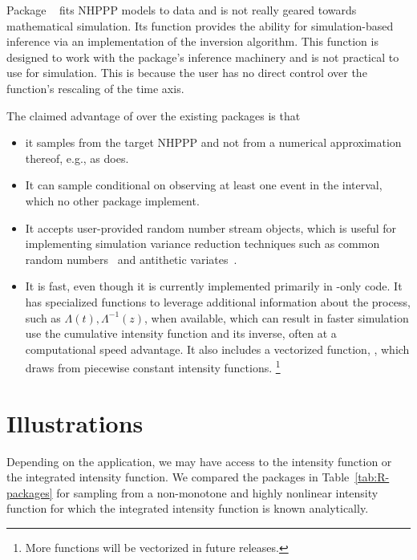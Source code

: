 \documentclass[article,nojss]{jss}\usepackage[]{graphicx}\usepackage[]{xcolor}
\newcommand{\fct}[1]{\code{#1()}}
\begin{document}
Package ~\citep{NHPoisson-jss, NHPoisson-package} fits NHPPP models to data and is not really geared towards mathematical simulation. Its \fct{simNHP.fun} function provides the ability for simulation-based inference via an implementation of the inversion algorithm. This function is designed to work with the package's inference machinery and is not practical to use for simulation. This is because the user has no direct control over the function's rescaling of the time axis.

The claimed advantage of  over the existing packages is that
\begin{itemize}
\item it samples from the target NHPPP and not from a numerical approximation thereof, e.g., as  does.
\item It can  sample conditional on observing at least one event in the interval, which no other package implement.
\item It accepts user-provided random number stream objects, which is useful for implementing simulation variance reduction techniques such as common random numbers~\citep{wright1979crn} and antithetic variates~\citep{hammersley1956av}.
\item It is fast, even though it is currently implemented primarily in -only code. It has specialized functions to leverage additional information about the process, such as $\Lambda(t), \Lambda^{-1}(z)$, when available, which can result in faster simulation  use the cumulative intensity function and its inverse, often at a computational speed advantage. It also includes a vectorized function, \fct{vdraw\_sc\_step\_regular}, which draws from piecewise constant intensity functions.%
\footnote{More functions will be vectorized in future releases.}
\end{itemize}



\section{Illustrations} \label{sec:illustrations}

Depending on the application, we may have access to the intensity function
or the integrated intensity function.
We compared the  packages in Table~\ref{tab:R-packages} for sampling from a non-monotone and highly nonlinear intensity function for which the integrated intensity function is known analytically.
\end{document}
